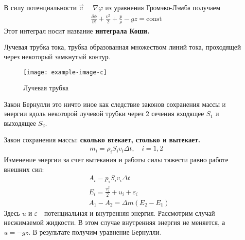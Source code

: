 \begin{enumerate}
{	В силу потенциальности $ \vec { v } = \nabla \varphi $ из уравнения Громэко-Лэмба получаем
	\begin{align*}
	\frac { \partial \phi } { \partial t } + \frac { v ^ { 2 } } { 2 } + \frac { p } { \rho } - g z = \mathrm { const }
	\end{align*}
	Этот интеграл носит название \textbf{интеграла Коши.}

	Лучевая трубка тока, трубка образованная множеством линий тока, проходящей через некоторый замкнутый контур.
	\begin{figure}[H]
		\centering
		\texttt{[image: example-image-c]}
		\caption{Лучевая трубка}
		\label{fig:figure7}
	\end{figure}

	Закон Бернулли это ничто иное как следствие законов сохранения  массы и энергии вдоль некоторой лучевой трубки через 2 сечения входящее $S_1$ и выходящее $S_2$.

	Закон сохранения массы: \textbf{сколько втекает, столько и вытекает.}
	\begin{align*}
	m _ { i } = \rho _ { i } S _ { i } v _ { i } \Delta t , \quad i = 1,2
	\end{align*}
	Изменение энергии за счет вытекания и работы силы тяжести равно работе внешних сил:
	\begin{align*}
	& A _ { i } = p _ { i } S _ { i } v _ { i } \Delta t \\
	& E _ { i } = \frac { v _ { i } ^ { 2 } } { 2 } + u _ { i } + \varepsilon _ { i } \\
	& A _ { 1 } - A _ { 2 } = \Delta m \left( E _ { 2 } - E _ { 1 } \right)
	\end{align*}
	Здесь $u$ и $\varepsilon$ - потенциальная и внутренняя энергия. Рассмотрим случай несжимаемой жидкости. В этом случае внутренняя энергия не меняется, а $ u = - g z $. В результате получим уравнение Бернулли.

	}
\end{enumerate}

